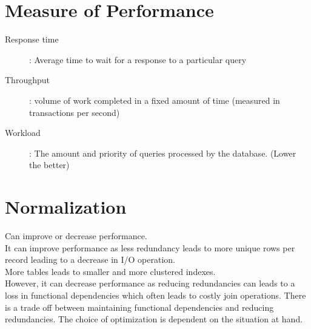 \documentclass{article}
\begin{document}
\section{Measure of Performance}
\begin{description}
    \item [Response time]: Average time to wait for a response to a particular query
    \item [Throughput]: volume of work completed in a fixed amount of time (measured in transactions per second)
    \item [Workload]: The amount and priority of queries processed by the database. (Lower the better)
\end{description}
\section{Normalization}
Can improve or decrease performance.\\
It can improve performance as less redundancy leads to more unique rows per record leading to a decrease in I/O operation.\\
More tables leads to smaller and more clustered indexes.\\
However, it can decrease performance as reducing redundancies can leads to a loss in functional dependencies which often leads to costly join operations.
There is a trade off between maintaining functional dependencies and reducing redundancies. The choice of optimization is dependent on the situation at hand.
\end{document}

